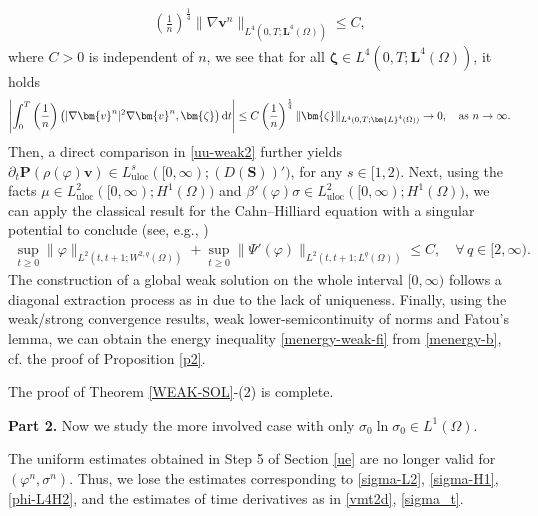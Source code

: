 \documentclass[11pt,reqno]{amsart}
\def\d{{\rm d}}
\newcommand{\uloc}{\operatorname{uloc}}
\def\vv{\bm{v}}
\begin{document}
 \begin{align}
\left(\frac{1}{n}\right)^\frac14\|\nabla \bm{v}^n\|_{L^{4}(0, T ; \bm{L}^4(\Omega))} \leq C,
\label{p4-estimate}
 \end{align}
 where $C>0$ is independent of $n$, we see that for all $\bm{\zeta}\in L^4(0,T;\bm{L}^4(\Omega))$, it holds
 $$
 \left|\int_0^T\left(\frac{1}{n}\right)\big(|\nabla \bm{v}^n|^2\nabla \bm{v}^n,\bm{\zeta}\big)\,\d t\right|
 \leq C\left(\frac{1}{n}\right)^\frac14\|\bm{\zeta}\|_{L^4(0,T;\bm{L}^4(\Omega))}\to 0,\quad \text{as}\ n\to \infty.
 $$
 Then, a direct comparison in \eqref{uu-weak2} further yields $\partial_t\bm{P}(\rho(\varphi)\vv)\in L_{\uloc}^{s}([0,\infty);(D(\bm{S}))')$, for any $s\in [1,2)$. Next, using the facts $\mu\in L^2_{\uloc}([0,\infty);H^1(\Omega))$ and $\beta'(\varphi)\sigma\in L^2_{\uloc}([0,\infty);H^1(\Omega))$, we can apply the classical result for the Cahn--Hilliard equation with a singular potential to conclude (see, e.g., \cite{GiGrWu2018})
%
\begin{align}
\sup_{t\geq 0}\|\varphi\|_{L^2(t,t+1;W^{2,q}(\Omega))}
+\sup_{t\geq 0}\|\Psi'(\varphi)\|_{L^2(t,t+1;L^q(\Omega))}
\leq C,\quad \forall\, q\in [2,\infty).
\label{es-vhi-W2q}
\end{align}
%
The construction of a global weak solution on the whole interval $[0,\infty)$ follows a diagonal extraction process as in \cite{Bo13} due to the lack of uniqueness.
Finally, using the weak/strong convergence results, weak lower-semicontinuity of norms and Fatou's lemma, we can obtain the energy inequality \eqref{menergy-weak-fi} from \eqref{menergy-b}, cf. the proof of Proposition \ref{p2}.

The proof of Theorem \ref{WEAK-SOL}-(2) is complete.
 \medskip

\textbf{Part 2.} Now we study the more involved case with only $\sigma_0\ln \sigma_0\in L^1(\Omega)$.

The uniform estimates obtained in Step 5 of Section \ref{ue} are no longer valid for $(\varphi^{n},\sigma^{n})$. Thus, we lose the estimates corresponding to \eqref{sigma-L2}, \eqref{sigma-H1}, \eqref{phi-L4H2}, and the estimates of time derivatives as in \eqref{vmt2d}, \eqref{sigma_t}.
\end{document}
